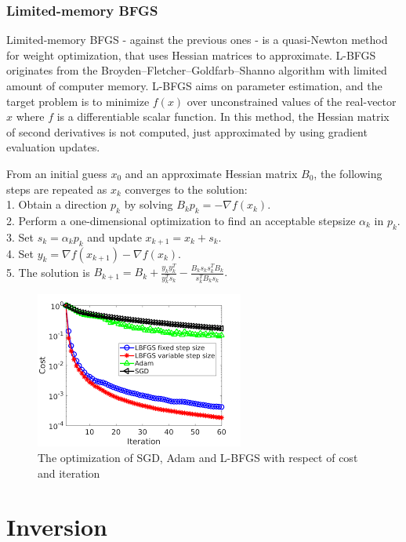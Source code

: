 \subsubsection{Limited-memory BFGS}

Limited-memory BFGS - against the previous ones - is a quasi-Newton method for weight optimization, that uses Hessian matrices to approximate. L-BFGS originates from the Broyden–Fletcher–Goldfarb–Shanno algorithm with limited amount of computer memory. L-BFGS aims on parameter estimation, and the target problem is to minimize $f(x)$ over unconstrained values of the real-vector $x$ where $f$ is a differentiable scalar function. In this method, the Hessian matrix of second derivatives is not computed, just approximated by using gradient evaluation updates. \medskip

\noindent From an initial guess $x_0$ and an approximate Hessian matrix $B_0$, the following steps are repeated as $x_k$ converges to the solution:\\
1. Obtain a direction $p_k$ by solving $B_k p_k = - \nabla f(x_k). $ \\
2. Perform a one-dimensional optimization to find an acceptable stepsize $\alpha_k$ in $p_k$. \\
3. Set $s_k = \alpha_k p_k$ and update $x_{k+1} = x_k + s_k.$ \\
4. Set $y_k = \nabla f(x_{k+1}) - \nabla f(x_k).$ \\ 
5. The solution is $B_{k+1} = B_k + \frac{y_k y^T_k}{y^T_k s_k} - \frac{B_k s_k s^T_k B_k}{s^T_k B_k s_k}.$

\begin{figure}[h]
	\centering
	\includegraphics[height=0.36\linewidth]{./figures/optimization}
	\caption{The optimization of SGD, Adam and L-BFGS with respect of cost and iteration}
	\label{fig:optimization}
\end{figure}



\section{Inversion}

